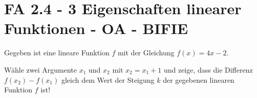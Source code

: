 \section{FA 2.4 - 3 Eigenschaften linearer Funktionen - OA - BIFIE}

\begin{beispiel}[FA 2.4]{1} %
Gegeben ist eine lineare Funktion $f$ mit der Gleichung $f(x)=4x-2$.

Wähle zwei Argumente $x_1$ und $x_2$ mit $x_2=x_1+1$ und zeige, dass die Differenz $f(x_2)-f(x_1)$ gleich dem Wert der Steigung $k$ der gegebenen linearen Funktion $f$ ist!
\leer

\end{beispiel}